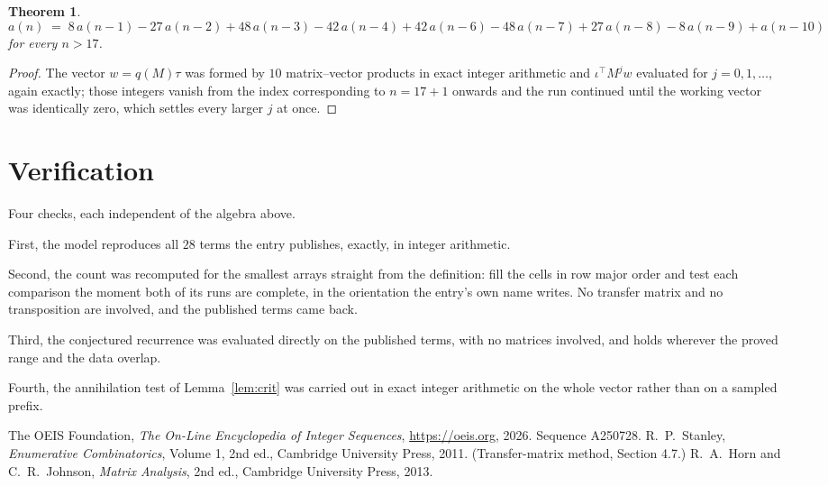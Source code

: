 \documentclass[11pt,a4paper]{article}
\theoremstyle{plain}
\newtheorem{theorem}{Theorem}
\theoremstyle{definition}
\begin{document}
\begin{theorem}
\[
a(n)\;=\;8\,a(n-1) - 27\,a(n-2) + 48\,a(n-3) - 42\,a(n-4) + 42\,a(n-6) - 48\,a(n-7) + 27\,a(n-8) - 8\,a(n-9) + a(n-10)
\]
for every $n>17$.
\end{theorem}

\begin{proof}
The vector $w=q(M)\tau$ was formed by $10$ matrix--vector products in exact integer
arithmetic and $\iota^{\!\top}M^{j}w$ evaluated for $j=0,1,\dots$, again exactly; those
integers vanish from the index corresponding to $n=17+1$ onwards and the run continued
until the working vector was identically zero, which settles every larger $j$ at once.
\end{proof}

\section{Verification}

Four checks, each independent of the algebra above.

First, the model reproduces all $28$ terms the entry publishes, exactly, in integer
arithmetic.

Second, the count was recomputed for the smallest arrays straight from the definition: fill the
cells in row major order and test each comparison the moment both of its runs are complete,
in the orientation the entry's own name writes. No transfer matrix and no transposition are
involved, and the published terms came back.

Third, the conjectured recurrence was evaluated directly on the published terms, with no
matrices involved, and holds wherever the proved range and the data overlap.

Fourth, the annihilation test of Lemma~\ref{lem:crit} was carried out in exact integer
arithmetic on the whole vector rather than on a sampled prefix.

\begin{thebibliography}{9}
 The OEIS Foundation, \emph{The On-Line Encyclopedia of Integer
Sequences}, \url{https://oeis.org}, 2026. Sequence A250728.
 R.~P.~Stanley, \emph{Enumerative Combinatorics}, Volume 1, 2nd ed.,
Cambridge University Press, 2011. (Transfer-matrix method, Section 4.7.)
 R.~A.~Horn and C.~R.~Johnson, \emph{Matrix Analysis}, 2nd ed., Cambridge
University Press, 2013.
\end{thebibliography}
\end{document}
